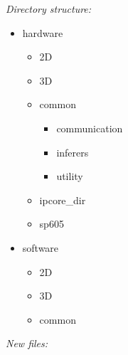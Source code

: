 \emph{Directory structure:}

\begin{itemize}
    \item hardware
    \begin{itemize}
        \item 2D
        \item 3D
        \item common
        \begin{itemize}
            \item communication
            \item inferers
            \item utility
        \end{itemize}
        \item ipcore\_dir
        \item sp605
    \end{itemize}
    \item software
    \begin{itemize}
        \item 2D
        \item 3D
        \item common
    \end{itemize}
\end{itemize}

\emph{New files:}

